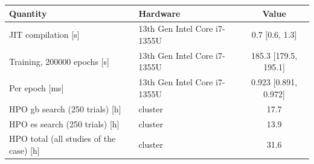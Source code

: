 \begin{tabular}{llc}
\toprule
Quantity & Hardware & Value \\
\midrule
JIT compilation [s] & 13th Gen Intel Core i7-1355U & \num{0.7} [\num{0.6}, \num{1.3}] \\
Training, \num{200000} epochs [s] & 13th Gen Intel Core i7-1355U & \num{185.3} [\num{179.5}, \num{195.1}] \\
Per epoch [ms] & 13th Gen Intel Core i7-1355U & \num{0.923} [\num{0.891}, \num{0.972}] \\
HPO gb search (250 trials) [h] & cluster & \num{17.7} \\
HPO es search (250 trials) [h] & cluster & \num{13.9} \\
HPO total (all studies of the case) [h] & cluster & \num{31.6} \\
\bottomrule
\end{tabular}
